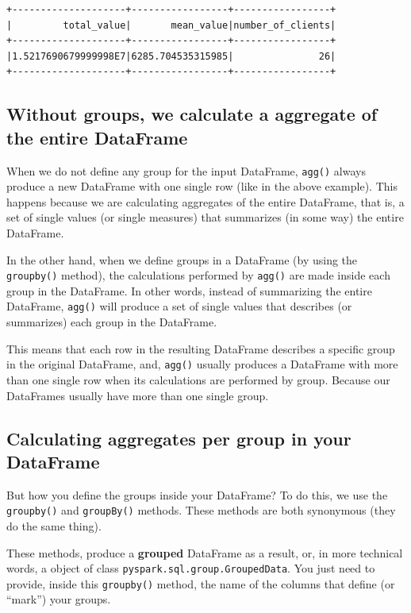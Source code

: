 \documentclass[
  11pt,
  letterpaper,
  DIV=11,
  numbers=noendperiod]{scrreprt}
\begin{document}
\begin{verbatim}
+--------------------+-----------------+-----------------+
|         total_value|       mean_value|number_of_clients|
+--------------------+-----------------+-----------------+
|1.5217690679999998E7|6285.704535315985|               26|
+--------------------+-----------------+-----------------+
\end{verbatim}

\hypertarget{without-groups-we-calculate-a-aggregate-of-the-entire-dataframe}{%
\subsection{Without groups, we calculate a aggregate of the entire
DataFrame}\label{without-groups-we-calculate-a-aggregate-of-the-entire-dataframe}}

When we do not define any group for the input DataFrame, \texttt{agg()}
always produce a new DataFrame with one single row (like in the above
example). This happens because we are calculating aggregates of the
entire DataFrame, that is, a set of single values (or single measures)
that summarizes (in some way) the entire DataFrame.

In the other hand, when we define groups in a DataFrame (by using the
\texttt{groupby()} method), the calculations performed by \texttt{agg()}
are made inside each group in the DataFrame. In other words, instead of
summarizing the entire DataFrame, \texttt{agg()} will produce a set of
single values that describes (or summarizes) each group in the
DataFrame.

This means that each row in the resulting DataFrame describes a specific
group in the original DataFrame, and, \texttt{agg()} usually produces a
DataFrame with more than one single row when its calculations are
performed by group. Because our DataFrames usually have more than one
single group.

\hypertarget{sec-group-by}{%
\subsection{Calculating aggregates per group in your
DataFrame}\label{sec-group-by}}

But how you define the groups inside your DataFrame? To do this, we use
the \texttt{groupby()} and \texttt{groupBy()} methods. These methods are
both synonymous (they do the same thing).

These methods, produce a \textbf{grouped} DataFrame as a result, or, in
more technical words, a object of class
\texttt{pyspark.sql.group.GroupedData}. You just need to provide, inside
this \texttt{groupby()} method, the name of the columns that define (or
``mark'') your groups.
\end{document}
